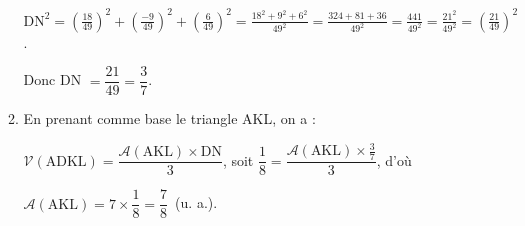 \begin{enumerate}
\begin{enumerate}
$\text{DN}^2 = \left(\frac{18}{49}\right)^2 + \left(\frac{-9}{49}\right)^2  + \left(\frac{6}{49}\right)^2 = \frac{18^2 + 9^2 + 6^2}{49^2} = \frac{324 + 81 + 36}{49^2} = \frac{441}{49^2} = \frac{21^2}{49^2} = \left(\frac{21}{49}\right)^2$. 

Donc DN $ = \dfrac{21}{49} = \dfrac{3}{7}$.
		\item %
	En prenant comme base le triangle AKL, on a :
	
$\mathcal{V}(\text{ADKL}) = \dfrac{\mathcal{A}(\text{AKL}) \times \text{DN}}{3}$, soit $\dfrac{1}{8} = \dfrac{\mathcal{A}(\text{AKL}) \times \frac{3}{7}}{3}$, d'où 

$\mathcal{A}(\text{AKL}) = 7 \times \dfrac{1}{8} = \dfrac{7}{8}$~(u. a.).
	\end{enumerate}
\end{enumerate}

\bigskip

